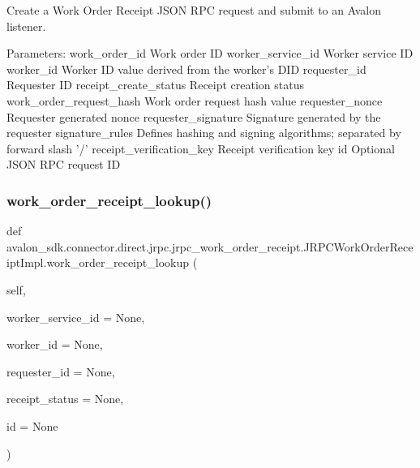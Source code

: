 \begin{DoxyVerb}Create a Work Order Receipt JSON RPC request and submit to an
Avalon listener.

Parameters:
work_order_id            Work order ID
worker_service_id        Worker service ID
worker_id                Worker ID value derived from the worker's DID
requester_id             Requester ID
receipt_create_status    Receipt creation status
work_order_request_hash  Work order request hash value
requester_nonce          Requester generated nonce
requester_signature      Signature generated by the requester
signature_rules          Defines hashing and signing algorithms;
                 separated by forward slash '/'
receipt_verification_key Receipt verification key
id                       Optional JSON RPC request ID
\end{DoxyVerb}
 \mbox{\label{classavalon__sdk_1_1connector_1_1direct_1_1jrpc_1_1jrpc__work__order__receipt_1_1JRPCWorkOrderReceiptImpl_ace4ee01a071cd19dc7a125227fd0994d}} 
\subsubsection{\texorpdfstring{work\+\_\+order\+\_\+receipt\+\_\+lookup()}{work\_order\_receipt\_lookup()}}
{\footnotesize\ttfamily def avalon\+\_\+sdk.\+connector.\+direct.\+jrpc.\+jrpc\+\_\+work\+\_\+order\+\_\+receipt.\+J\+R\+P\+C\+Work\+Order\+Receipt\+Impl.\+work\+\_\+order\+\_\+receipt\+\_\+lookup (\begin{DoxyParamCaption}\item[{}]{self,  }\item[{}]{worker\+\_\+service\+\_\+id = {\ttfamily None},  }\item[{}]{worker\+\_\+id = {\ttfamily None},  }\item[{}]{requester\+\_\+id = {\ttfamily None},  }\item[{}]{receipt\+\_\+status = {\ttfamily None},  }\item[{}]{id = {\ttfamily None} }\end{DoxyParamCaption})}

